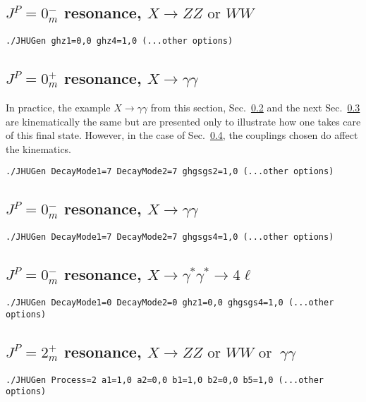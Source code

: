 \documentclass[aps,superscriptaddress,nofootinbib]{revtex4}
\begin{document}
\subsection{\texorpdfstring{$J^P = 0^-_m$ resonance, $X \to ZZ\text{ or }WW$}{JP=0-m resonance, X -> ZZ or WW}}
\label{sec:exB}
\begin{verbatim}
./JHUGen ghz1=0,0 ghz4=1,0 (...other options)
\end{verbatim}
\subsection{\texorpdfstring{$J^P = 0^+_m$ resonance, $X \to \gamma \gamma$}{JP=0+m resonance, X -> gamma gamma}}
\label{sec:exC}
In practice, the example $X \to \gamma \gamma$ from this section, Sec.~\ref{sec:exC} and the next Sec.~\ref{sec:exD} are
kinematically the same but are presented only to illustrate how one takes care of this final state.  However, in the case of Sec.~\ref{sec:exE}, the couplings chosen do affect the kinematics.
\begin{verbatim}
./JHUGen DecayMode1=7 DecayMode2=7 ghgsgs2=1,0 (...other options)
\end{verbatim}
\subsection{\texorpdfstring{$J^P = 0^-_m$ resonance, $X \to \gamma \gamma$}{JP=0-m resonance, X -> gamma gamma}}
\label{sec:exD}
\begin{verbatim}
./JHUGen DecayMode1=7 DecayMode2=7 ghgsgs4=1,0 (...other options)
\end{verbatim}
\subsection{\texorpdfstring{$J^P=0^-_m$ resonance, $X\to\gamma^*\gamma^*\to4\ell$}{JP=0-m resonance, X -> gamma* gamma* -> 4l}}
\label{sec:exE}
\begin{verbatim}
./JHUGen DecayMode1=0 DecayMode2=0 ghz1=0,0 ghgsgs4=1,0 (...other options)
\end{verbatim}
\subsection{\texorpdfstring{$J^P = 2^+_m$ resonance, $X \to ZZ\text{ or }WW\text{ or }~\gamma\gamma$}{JP=2+m resonance, X -> ZZ or WW or gamma gamma}}
\begin{verbatim}
./JHUGen Process=2 a1=1,0 a2=0,0 b1=1,0 b2=0,0 b5=1,0 (...other options)
\end{verbatim}
\end{document}
